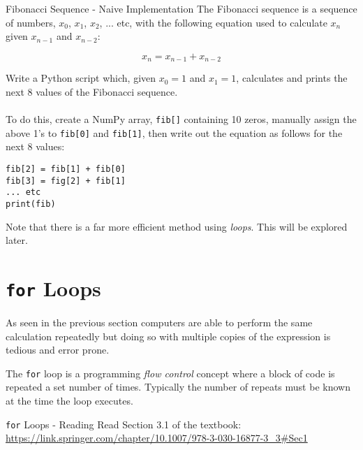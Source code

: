 \documentclass{lab}
\begin{document}
\begin{task}{Fibonacci  Sequence - Naive Implementation}{}
The Fibonacci sequence is a sequence of numbers, $x_0$, $x_1$, $x_2$, ... etc, with the following equation used to calculate $x_n$ given $x_{n-1}$ and $x_{n-2}$:

\begin{equation}\label{eq:fib}
x_n = x_{n-1} + x_{n-2}
\end{equation}

Write a Python script which, given $x_0=1$ and $x_1=1$, calculates and prints the next 8 values of the Fibonacci sequence.
\\~\\
To do this, create a NumPy array, \texttt{fib[]} containing 10 zeros, manually assign the above 1's to \texttt{fib[0]} and \texttt{fib[1]}, then write out the equation as follows for the next 8 values:
\begin{lstlisting}
fib[2] = fib[1] + fib[0]
fib[3] = fig[2] + fib[1]
... etc
print(fib)
\end{lstlisting}

Note that there is a far more efficient method using \textit{loops}. This will be explored later.
\end{task}

\section{\texttt{for} Loops}

As seen in the previous section computers are able to perform the same calculation repeatedly but doing so with multiple copies of the expression is tedious and error prone.

The \texttt{for} loop is a programming \textit{flow control} concept where a block of code is repeated a set number of times. Typically the number of repeats must be known at the time the loop executes.

\begin{task}{\texttt{for} Loops - Reading}{}
Read Section 3.1 of the textbook: \url{https://link.springer.com/chapter/10.1007/978-3-030-16877-3_3#Sec1}
\end{task}
\end{document}

